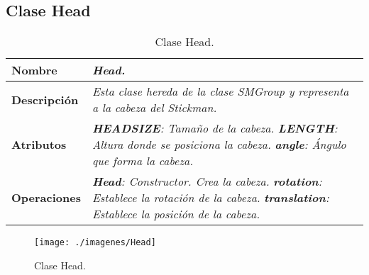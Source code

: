       \subsection{Clase Head}
         \begin{table}[!ht] 
            \centering
            \begin{tabular}{|p{4cm}|p{11.5cm}|}
            \hline
            \textbf{Nombre} & \textit{Head.}\\ \hline
            \textbf{Descripción} & \textit{Esta clase hereda de la clase SMGroup y representa a la cabeza del Stickman.}\\ \hline
            \textbf{Atributos} & \textit{\textbf{HEADSIZE}: Tamaño de la cabeza.}\newline
                                 \textit{\textbf{LENGTH}: Altura donde se posiciona la cabeza.}\newline
                                 \textit{\textbf{angle}: Ángulo que forma la cabeza.}\\ \hline
            \textbf{Operaciones} & \textit{\textbf{Head}: Constructor. Crea la cabeza.}\newline
                                    \textit{\textbf{rotation}: Establece la rotación de la cabeza.}\newline
                                    \textit{\textbf{translation}: Establece la posición de la cabeza.}\\ \hline
            \end{tabular}
            \caption{Clase Head.}
         \end{table}
         \begin{figure} [H] \begin{center}
            \texttt{[image: ./imagenes/Head]}\label{Head}
            \caption{Clase Head.}
         \end{center} \end{figure}



